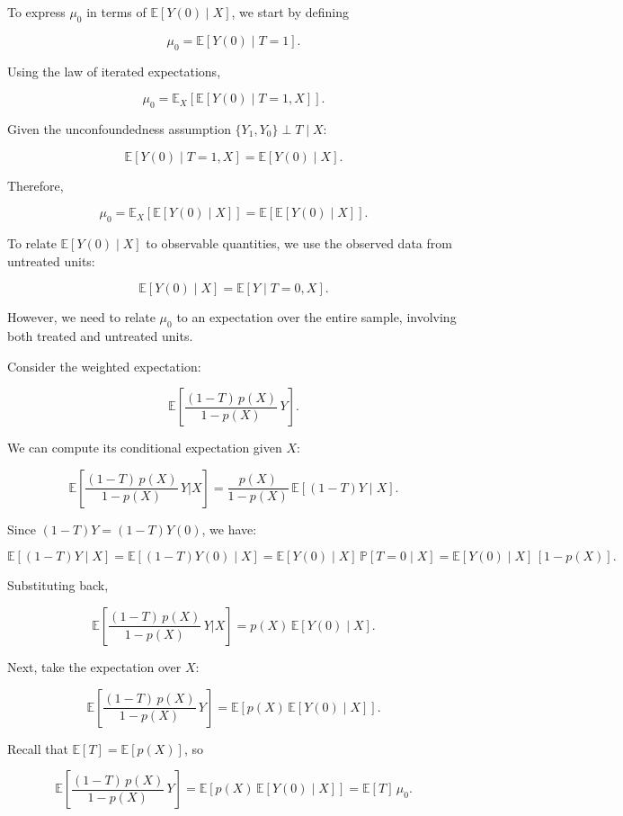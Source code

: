 \documentclass{article}
\begin{document}
To express \(\mu_0\) in terms of \(\mathbb{E}[Y(0) \mid X]\), we start by defining

\[
\mu_0 = \mathbb{E}[Y(0) \mid T = 1].
\]

Using the law of iterated expectations,

\[
\mu_0 = \mathbb{E}_X\left[ \mathbb{E}[Y(0) \mid T = 1, X] \right].
\]

Given the unconfoundedness assumption \(\{Y_1, Y_0\} \perp T \mid X\):

\[
\mathbb{E}[Y(0) \mid T = 1, X] = \mathbb{E}[Y(0) \mid X].
\]

Therefore,

\[
\mu_0 = \mathbb{E}_X\left[ \mathbb{E}[Y(0) \mid X] \right] = \mathbb{E}[ \mathbb{E}[Y(0) \mid X] ].
\]

To relate \(\mathbb{E}[Y(0) \mid X]\) to observable quantities, we use the observed data from untreated units:

\[
\mathbb{E}[Y(0) \mid X] = \mathbb{E}[Y \mid T = 0, X].
\]

However, we need to relate \(\mu_0\) to an expectation over the entire sample, involving both treated and untreated units.

Consider the weighted expectation:

\[
\mathbb{E}\left[ \frac{(1 - T) \, p(X)}{1 - p(X)} \, Y \right].
\]

We can compute its conditional expectation given \(X\):

\[
\mathbb{E}\left[ \frac{(1 - T) \, p(X)}{1 - p(X)} \, Y \Big| X \right] = \frac{p(X)}{1 - p(X)} \, \mathbb{E}\left[ (1 - T) Y \mid X \right].
\]

Since \( (1 - T) Y = (1 - T) Y(0) \), we have:

\[
\mathbb{E}\left[ (1 - T) Y \mid X \right] = \mathbb{E}[ (1 - T) Y(0) \mid X ] = \mathbb{E}[ Y(0) \mid X ] \, \mathbb{P}[ T = 0 \mid X ] = \mathbb{E}[ Y(0) \mid X ] \, [1 - p(X)].
\]

Substituting back,

\[
\mathbb{E}\left[ \frac{(1 - T) \, p(X)}{1 - p(X)} \, Y \Big| X \right] = p(X) \, \mathbb{E}[ Y(0) \mid X ].
\]

Next, take the expectation over \(X\):

\[
\mathbb{E}\left[ \frac{(1 - T) \, p(X)}{1 - p(X)} \, Y \right] = \mathbb{E}\left[ p(X) \, \mathbb{E}[ Y(0) \mid X ] \right].
\]

Recall that \(\mathbb{E}[T] = \mathbb{E}[ p(X) ]\), so

\[
\mathbb{E}\left[ \frac{(1 - T) \, p(X)}{1 - p(X)} \, Y \right] = \mathbb{E}[ p(X) \, \mathbb{E}[ Y(0) \mid X ] ] = \mathbb{E}[T] \, \mu_0.
\]
\end{document}
